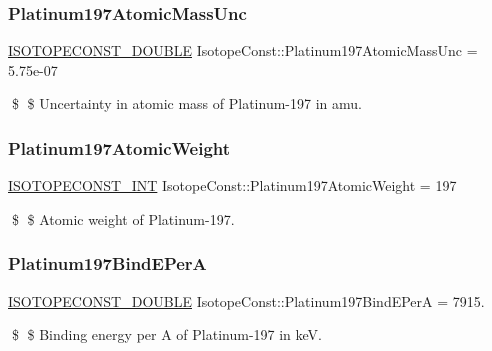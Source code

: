 \subsubsection{\texorpdfstring{Platinum197\+Atomic\+Mass\+Unc}{Platinum197AtomicMassUnc}}
{\footnotesize\ttfamily \mbox{\hyperlink{group___isotope_const-_macros_ga8f45a7272ce02c0b4c65c44636ed719a}{I\+S\+O\+T\+O\+P\+E\+C\+O\+N\+S\+T\+\_\+\+D\+O\+U\+B\+LE}} Isotope\+Const\+::\+Platinum197\+Atomic\+Mass\+Unc = 5.\+75e-\/07}

\$ \$ Uncertainty in atomic mass of Platinum-\/197 in amu. \mbox{\label{group___isotope_const-_platinum-_pt197_gae1363ff92b03e2b027305d63623f9dd6}} 
\subsubsection{\texorpdfstring{Platinum197\+Atomic\+Weight}{Platinum197AtomicWeight}}
{\footnotesize\ttfamily \mbox{\hyperlink{group___isotope_const-_macros_ga5f18360b3e99483a35c32d789e62621c}{I\+S\+O\+T\+O\+P\+E\+C\+O\+N\+S\+T\+\_\+\+I\+NT}} Isotope\+Const\+::\+Platinum197\+Atomic\+Weight = 197}

\$ \$ Atomic weight of Platinum-\/197. \mbox{\label{group___isotope_const-_platinum-_pt197_ga694fd145c82611eb9cf4d2004d5f9721}} 
\subsubsection{\texorpdfstring{Platinum197\+Bind\+E\+PerA}{Platinum197BindEPerA}}
{\footnotesize\ttfamily \mbox{\hyperlink{group___isotope_const-_macros_ga8f45a7272ce02c0b4c65c44636ed719a}{I\+S\+O\+T\+O\+P\+E\+C\+O\+N\+S\+T\+\_\+\+D\+O\+U\+B\+LE}} Isotope\+Const\+::\+Platinum197\+Bind\+E\+PerA = 7915.}

\$ \$ Binding energy per A of Platinum-\/197 in keV. \mbox{\label{group___isotope_const-_platinum-_pt197_ga8561afd1865861fefe3e240205251b74}} 
